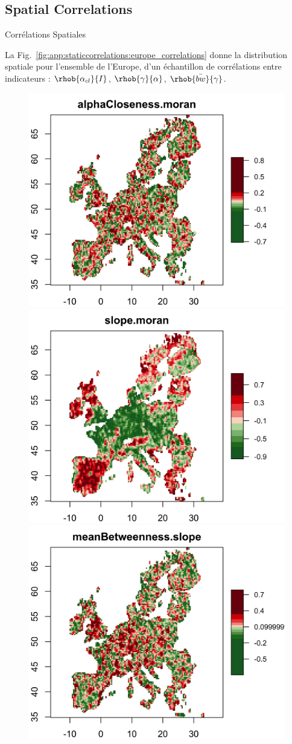 \subsection{Spatial Correlations}{Corrélations Spatiales}

La Fig.~\ref{fig:app:staticcorrelations:europe_correlations} donne la distribution spatiale pour l'ensemble de l'Europe, d'un échantillon de corrélations entre indicateurs : $\rhob{\alpha_{cl}}{I}$, $\rhob{\gamma}{\alpha}$, $\rhob{\bar{bw}}{\gamma}$.

\begin{figure}
\includegraphics[width=0.48\linewidth]{Figures/StaticCorrelations/EU_corr_alphaCloseness_moran_rhoasize12}
\includegraphics[width=0.48\linewidth]{Figures/StaticCorrelations/EU_corr_slope_moran_rhoasize12}\\
\includegraphics[width=0.48\linewidth]{Figures/StaticCorrelations/EU_corr_meanBetweenness_slope_rhoasize12}
\end{figure}



